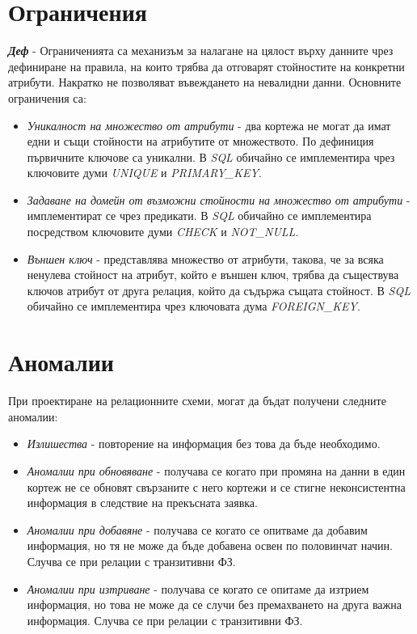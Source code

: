 \documentclass[fleqn,12pt]{article}
\begin{document}
\section{Ограничения}

\textbf{\textit{Деф}} - Ограниченията са механизъм за налагане на цялост върху данните чрез дефиниране на правила, на които трябва да отговарят стойностите на конкретни атрибути.
Накратко не позволяват въвеждането на невалидни данни.
Основните ограничения са:
\begin{itemize}
    \item \textit{Уникалност на множество от атрибути} - два кортежа не могат да имат едни и същи стойности на атрибутите от множеството.
    По дефиниция първичните ключове са уникални.
    В \textit{SQL} обичайно се имплементира чрез ключовите думи \textit{UNIQUE} и \textit{PRIMARY\_KEY}.
    \item \textit{Задаване на домейн от възможни стойности на множество от атрибути} - имплементират се чрез предикати.
    В \textit{SQL} обичайно се имплементира посредством ключовите думи \textit{CHECK} и \textit{NOT\_NULL}.
    \item \textit{Външен ключ} - представлява множество от атрибути, такова, че за всяка ненулева стойност на атрибут, който е външен ключ, трябва да съществува ключов атрибут от друга релация, който да съдържа същата стойност.
    В \textit{SQL} обичайно се имплементира чрез ключовата дума \textit{FOREIGN\_KEY}.
\end{itemize}

\section{Аномалии}

При проектиране на релационните схеми, могат да бъдат получени следните аномалии:
\begin{itemize}
    \item \textit{Излишества} - повторение на информация без това да бъде необходимо.
    \item \textit{Аномалии при обновяване} - получава се когато при промяна на данни в един кортеж не се обновят свързаните с него кортежи и се стигне неконсистентна информация в следствие на прекъсната заявка.
    \item \textit{Аномалии при добавяне} - получава се когато се опитваме да добавим информация, но тя не може да бъде добавена освен по половинчат начин. Случва се при релации с транзитивни ФЗ.
    \item \textit{Аномалии при изтриване} - получава се когато се опитаме да изтрием информация, но това не може да се случи без премахването на друга важна информация. Случва се при релации с транзитивни ФЗ.
\end{itemize}
\end{document}
